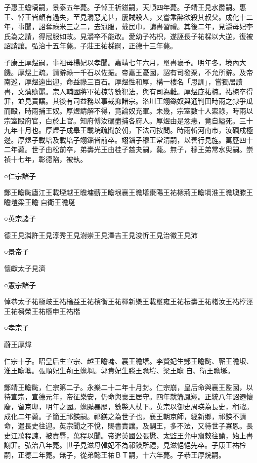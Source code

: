 子惠王蟾塙嗣，景泰五年薨。子悼王祈鎡嗣，天順四年薨。子靖王見水爵嗣。惠王、悼王皆頗有過失，至見灂惡尤甚，屢賊殺人，又嘗乘醉欲殺其叔父。成化十二年，事聞，詔奪祿米三之二，去冠服，戴民巾，讀書習禮。其後二年，見灂母妃李氏為之請，得冠服如故。見灂卒不能改。愛幼子祐枳，遂誣長子祐棌以大逆，復被詔誚讓。弘治十五年薨。子莊王祐棌嗣，正德十三年薨。

子康王厚煜嗣，事祖母楊妃以孝聞。嘉靖七年六月，璽書褒予。明年冬，境內大饑。厚煜上疏，請辭祿一千石以佐振。帝嘉王憂國，詔有司發粟，不允所辭。及帝南巡，厚煜遠出迎，命益祿三百石。厚煜性和厚，構一樓名「思訓」，嘗獨居讀書，文藻贍麗。宗人輔國將軍祐椋等數犯法，與有司為難。厚煜庇祐椋。祐椋卒得罪，並見責讓。其後有司益務以事裁抑諸宗。洛川王翊鏴奴與通判田時雨之隸爭瓜而毆，時雨捕王奴。厚煜請解不得，竟論奴充軍。未幾，宗室數十人索祿，時雨以宗室毆府官，白於上官。知府傅汝礪盡捕各府人。厚煜由是忿恚，竟自縊死。三十九年十月也。厚煜子成皋王載垸疏聞於朝，下法司按問。時雨斬河南市，汝礪戍極邊。厚煜子載培及載培子翊錙皆前卒。翊錙子穆王常清嗣，以善行見旌。萬歷四十二年薨。世子由松前卒，弟壽光王由桂子慈夬嗣，薨。無子，穆王弟常水臾嗣。崇禎十七年，彰德陷，被執。

○仁宗諸子

鄭王瞻颭廬江王載堙越王瞻墉蘄王瞻垠襄王瞻墡棗陽王祐楒荊王瞻堈淮王瞻墺滕王瞻塏梁王瞻自衛王瞻埏

○英宗諸子

德王見潾許王見淳秀王見澍崇王見澤吉王見浚忻王見治徽王見沛

○景帝子

懷獻太子見濟

○憲宗諸子

悼恭太子祐極岐王祐棆益王祐檳衡王祐楎新樂王載璽雍王祐枟壽王祐楮汝王祐梈涇王祐橓榮王祐樞申王祐楷

○孝宗子

蔚王厚煒

仁宗十子。昭皇后生宣宗、越王瞻墉、襄王瞻墡。李賢妃生鄭王瞻颭、蘄王瞻垠、淮王瞻墺。張順妃生荊王蟾堈。郭貴妃生滕王瞻塏、梁王瞻自、衛王瞻埏。

鄭靖王瞻颭，仁宗第二子。永樂二十二年十月封。仁宗崩，皇后命與襄王監國，以待宣宗，宣德元年，帝征樂安，仍命與襄王居守。四年就籓鳳翔。正統八年詔遷懷慶，留京邸，明年之國。蟾颭暴歷，數斃人杖下。英宗以御史周瑛為長史，稍戢。成化二年薨。子簡王祁鍈嗣。祁鍈之為世子也，襄王朝京師，經新鄉，祁鍈不請命，遣長史往迎。英宗聞之不悅，賜書責讓。及嗣王，多不法，又待世子寡恩。長史江萬程諫，被責辱，萬程以聞。帝遣英國公張懋、太監王允中齎敕往諭，始上書謝罪。弘治八年薨。世子見滋母韓妃不為祁鍈所禮，見滋悒悒先卒。子康王祐枔嗣，正德二年薨。無子，從弟懿王祐ＢＴ嗣，十六年薨。子恭王厚烷嗣。

